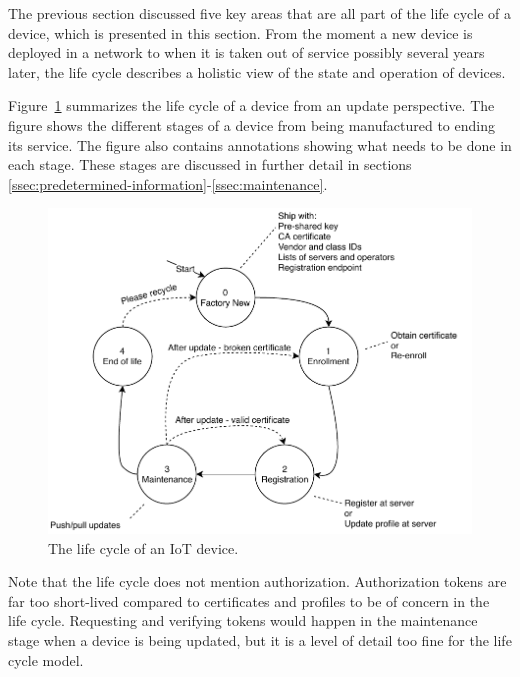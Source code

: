 \documentclass[0-thesis.tex]{subfiles}
\begin{document}
The previous section discussed five key areas that are all part of the life cycle of a
device, which is presented in this section. From the moment a new device is deployed in a
network to when it is taken out of service possibly several years later, the life cycle
describes a holistic view of the state and operation of devices.

Figure~\ref{fig:lifecycle} summarizes the life cycle of a device from an update
perspective. The figure shows the different stages of a device from being manufactured to
ending its service. The figure also contains annotations showing what needs to be done in
each stage. These stages are discussed in further detail in sections
\ref{ssec:predetermined-information}-\ref{ssec:maintenance}. 

\begin{figure}[t]
    \caption{The life cycle of an IoT device.}
    \label{fig:lifecycle}
    \includegraphics{images/lifecycle.pdf}
\end{figure}

Note that the life cycle does not mention authorization. Authorization tokens are far too
short-lived compared to certificates and profiles to be of concern in the life cycle.
Requesting and verifying tokens would happen in the maintenance stage when a device is
being updated, but it is a level of detail too fine for the life cycle model.
\end{document}
